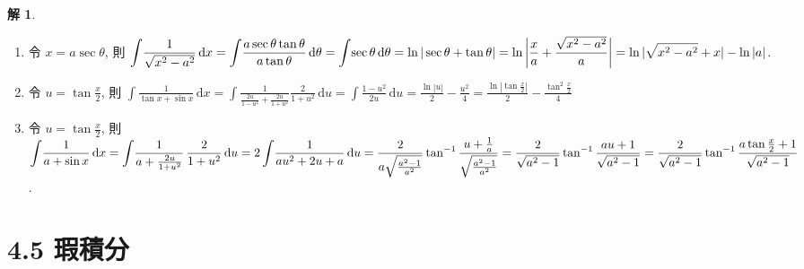 \documentclass[12pt]{extarticle}
\newcommand{\ds}{\displaystyle}
\theoremstyle{definition}
\newtheorem*{sol}{解}
\begin{document}
\begin{sol}
\begin{enumerate}
    \item 令 $\ds x = a\sec\theta$, 則 $\ds\int\!\frac{1}{\sqrt{x^2 - a^2}}\,\text{d}x = \int\!\frac{a\sec\theta\tan\theta}{a\tan\theta}\,\text{d}\theta = \int\!\sec\theta\,\text{d}\theta = \ln|\sec\theta + \tan\theta| \\ = \ln\bigg|\frac{x}{a} + \frac{\sqrt{x^2 - a^2}}{a}\bigg| = \ln|\sqrt{x^2 - a^2} + x| - \ln|a|$.
    \item 令 $\ds u = \tan\frac{x}{2}$, 則 $\ds\int\!\frac{1}{\tan x + \sin x}\,\text{d}x =\int\!\frac{1}{\frac{2u}{1 - u^2} + \frac{2u}{1 + u^2}}\frac{2}{1 + u^2}\,\text{d}u = \int\!\frac{1 - u^2}{2u}\,\text{d}u = \frac{\ln|u|}{2} - \frac{u^2}{4} = \frac{\ln|\tan\frac{x}{2}|}{2} - \frac{\tan^2\!\frac{x}{2}}{4}$
    \item 令 $\ds u = \tan\frac{x}{2}$, 則 $\ds\int\!\frac{1}{a + \sin x}\,\text{d}x = \int\!\frac{1}{a + \frac{2 u}{1 + u^2}}\,\frac{2}{1 + u^2}\,\text{d}u = 2\int\!\frac{1}{a u^2 + 2 u + a}\,\text{d}u = \frac{2}{a\sqrt{\frac{a^2 - 1}{a^2}}}\tan^{-1}\frac{{u + \frac{1}{a}}}{\sqrt{\frac{a^2 - 1}{a^2}}} \\ = \frac{2}{\sqrt{a^2 - 1}}\tan^{-1}\frac{a u + 1}{\sqrt{a^2 - 1}} = \frac{2}{\sqrt{a^2 - 1}}\tan^{-1}\frac{a\tan\frac{x}{2} + 1}{\sqrt{a^2 - 1}}$. 
  \end{enumerate}
\end{sol}

\section*{4.5 瑕積分}
\end{document}
